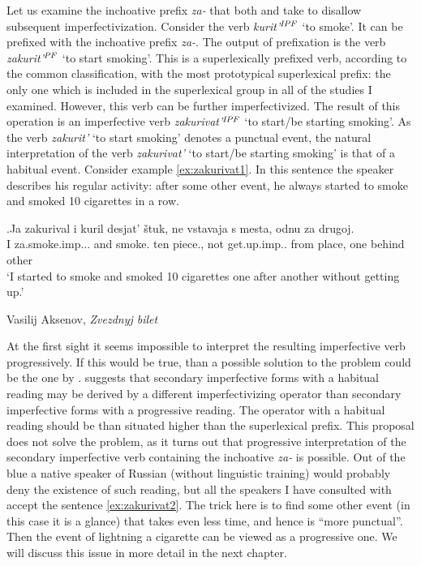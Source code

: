 Let us examine the inchoative prefix \textit{za-} that both \citet[230]{Svenonius:04b} and \citet[116]{Tatevosov:09} take to disallow subsequent imperfectivization. Consider the verb \textit{kurit'}$^{\mathit{IPF}}$ `to smoke'. It can be prefixed with the inchoative prefix {\textit{za-}.} The output of prefixation is the verb \textit{zakurit'}$^{\mathit{PF}}$ `to start smoking'. This is a superlexically prefixed verb, according to the common classification, with the most prototypical superlexical prefix: the only one which is included in the superlexical group in all of the studies I examined. However, this verb can be further imperfectivized. The result of this operation is an imperfective verb \textit{zakurivat'}$^{\mathit{IPF}}$ `to start/be starting smoking'. As the verb \textit{zakurit'} `to start smoking' denotes a punctual event, the natural interpretation of the verb \textit{zakurivat'} `to start/be starting smoking'  is that of a habitual event. Consider example \ref{ex:zakurivat1}. In this sentence the speaker describes his regular activity: after some other event, he always started to smoke and smoked 10 cigarettes in a row. 

\exg.\label{ex:zakurivat1}Ja zakurival i kuril desjat' \v{s}tuk, ne vstavaja s mesta, odnu za drugoj.\\
I za.smoke.imp... and smoke. ten piece., not get.up.imp.. from place, one behind other\\
\vspace{0.5em}
`I started to smoke and smoked 10 cigarettes one after another without getting up.'
\begin{flushright}
\vspace{-1em}
Vasilij Aksenov, \textit{Zvezdnyj bilet}
\end{flushright}

At the first sight it seems impossible to interpret the resulting imperfective verb progressively. If this would be true, than a possible solution to the problem could be the one by \citet{Ramchand:04}. \citet{Ramchand:04} suggests that secondary imperfective forms with a habitual reading may be derived by a different imperfectivizing operator than secondary imperfective forms with a progressive reading. The operator with a habitual reading should be than situated higher than the superlexical prefix. This proposal does not solve the problem, as it turns out that progressive interpretation of the secondary imperfective verb containing the inchoative \textit{za-} is possible. Out of the blue a native speaker of Russian (without linguistic training) would probably deny the existence of such reading, but all the speakers I have consulted with accept the sentence \ref{ex:zakurivat2}. The trick here is to find some other event (in this case it is a glance) that takes even less time, and hence is ``more punctual''. Then the event of lightning a cigarette can be viewed as a progressive one. We will discuss this issue in more detail in the next chapter.

